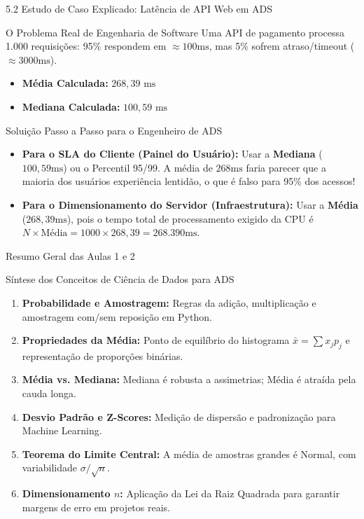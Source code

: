 \documentclass[10pt, aspectratio=169]{beamer}
\begin{document}
\begin{frame}[fragile]{5.2 Estudo de Caso Explicado: Latência de API Web em ADS}
    \begin{block}{O Problema Real de Engenharia de Software}
        Uma API de pagamento processa 1.000 requisições: 95\% respondem em $\approx 100\text{ms}$, mas 5\% sofrem atraso/timeout ($\approx 3000\text{ms}$).
        \begin{itemize}
            \item \textbf{Média Calculada:} $268{,}39 \text{ ms}$
            \item \textbf{Mediana Calculada:} $100{,}59 \text{ ms}$
        \end{itemize}
    \end{block}

    \vspace{0.2cm}

    \begin{exampleblock}{Soluição Passo a Passo para o Engenheiro de ADS}
        \begin{itemize}
            \item \textbf{Para o SLA do Cliente (Painel do Usuário):} Usar a \textbf{Mediana} ($100{,}59\text{ms}$) ou o Percentil 95/99. A média de $268\text{ms}$ faria parecer que a maioria dos usuários experiência lentidão, o que é falso para 95\% dos acessos!
            \item \textbf{Para o Dimensionamento do Servidor (Infraestrutura):} Usar a \textbf{Média} ($268{,}39\text{ms}$), pois o tempo total de processamento exigido da CPU é $N \times \text{Média} = 1000 \times 268{,}39 = 268.390\text{ms}$.
        \end{itemize}
    \end{exampleblock}
\end{frame}

\begin{frame}{Resumo Geral das Aulas 1 e 2}
    \begin{block}{Síntese dos Conceitos de Ciência de Dados para ADS}
        \begin{enumerate}
            \item \textbf{Probabilidade e Amostragem:} Regras da adição, multiplicação e amostragem com/sem reposição em Python.
            \item \textbf{Propriedades da Média:} Ponto de equilíbrio do histograma $\bar{x} = \sum x_j p_j$ e representação de proporções binárias.
            \item \textbf{Média vs. Mediana:} Mediana é robusta a assimetrias; Média é atraída pela cauda longa.
            \item \textbf{Desvio Padrão e Z-Scores:} Medição de dispersão e padronização para Machine Learning.
            \item \textbf{Teorema do Limite Central:} A média de amostras grandes é Normal, com variabilidade $\sigma/\sqrt{n}$.
            \item \textbf{Dimensionamento $n$:} Aplicação da Lei da Raiz Quadrada para garantir margens de erro em projetos reais.
        \end{enumerate}
    \end{block}
\end{frame}
\end{document}
